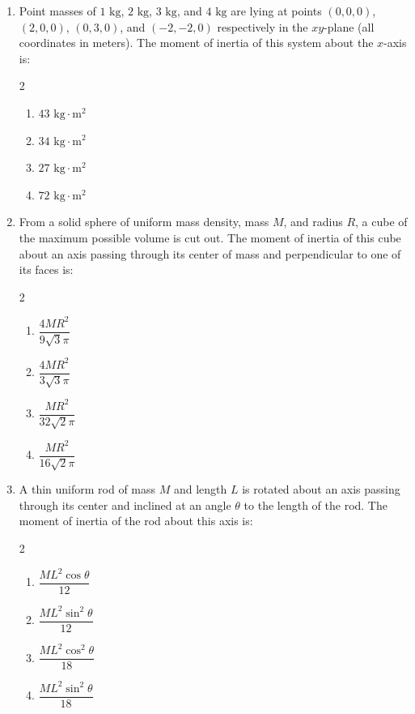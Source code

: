 \documentclass[11pt,a4paper]{article}
\begin{document}
\begin{enumerate}[label=\textbf{Q\arabic*.},leftmargin=24pt,itemsep=12pt]
  \item Point masses of $1\text{ kg}$, $2\text{ kg}$, $3\text{ kg}$, and $4\text{ kg}$ are lying at points $(0, 0, 0)$, $(2, 0, 0)$, $(0, 3, 0)$, and $(-2, -2, 0)$ respectively in the $xy$-plane (all coordinates in meters). The moment of inertia of this system about the $x$-axis is:
  \begin{multicols}{2}
  \begin{enumerate}[label=(\Alph*),itemsep=2pt]
    \item $43\text{ kg}\cdot\text{m}^2$
    \item $34\text{ kg}\cdot\text{m}^2$
    \item $27\text{ kg}\cdot\text{m}^2$
    \item $72\text{ kg}\cdot\text{m}^2$
  \end{enumerate}
  \end{multicols}

  \item From a solid sphere of uniform mass density, mass $M$, and radius $R$, a cube of the maximum possible volume is cut out. The moment of inertia of this cube about an axis passing through its center of mass and perpendicular to one of its faces is:
  \begin{multicols}{2}
  \begin{enumerate}[label=(\Alph*),itemsep=2pt]
    \item $\dfrac{4 M R^2}{9\sqrt{3}\pi}$
    \item $\dfrac{4 M R^2}{3\sqrt{3}\pi}$
    \item $\dfrac{M R^2}{32\sqrt{2}\pi}$
    \item $\dfrac{M R^2}{16\sqrt{2}\pi}$
  \end{enumerate}
  \end{multicols}

  \item A thin uniform rod of mass $M$ and length $L$ is rotated about an axis passing through its center and inclined at an angle $\theta$ to the length of the rod. The moment of inertia of the rod about this axis is:
  \begin{multicols}{2}
  \begin{enumerate}[label=(\Alph*),itemsep=2pt]
    \item $\dfrac{M L^2 \cos\theta}{12}$
    \item $\dfrac{M L^2 \sin^2\theta}{12}$
    \item $\dfrac{M L^2 \cos^2\theta}{18}$
    \item $\dfrac{M L^2 \sin^2\theta}{18}$
  \end{enumerate}
  \end{multicols}


\end{enumerate}
\end{document}
